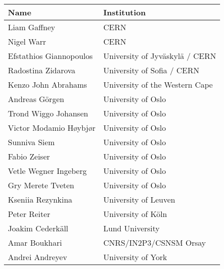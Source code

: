 \begin{tabular}{ll}
\hline
Name                     & Institution                      \\
\hline
Liam Gaffney             & CERN                             \\
Nigel Warr               & CERN                             \\
Efstathios Giannopoulos  & University of Jyväskylä / CERN   \\
Radostina Zidarova       & University of Sofia / CERN       \\
Kenzo John Abrahams      & University of the Western Cape   \\
Andreas Görgen           & University of Oslo               \\
Trond Wiggo Johansen     & University of Oslo               \\
Victor Modamio Høybjør   & University of Oslo               \\
Sunniva Siem             & University of Oslo               \\
Fabio Zeiser             & University of Oslo               \\
Vetle Wegner Ingeberg    & University of Oslo               \\
Gry Merete Tveten        & University of Oslo               \\
Kseniia Rezynkina        & University of Leuven             \\
Peter Reiter             & University of Köln               \\
Joakim Cederkäll         & Lund University                  \\
Amar Boukhari            & CNRS/IN2P3/CSNSM Orsay           \\
Andrei Andreyev          & University of York               \\
\hline
\end{tabular}